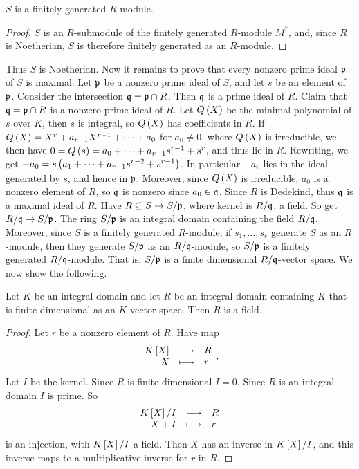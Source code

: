 \begin{corollary}
$ S $ is a finitely generated $ R $-module.
\end{corollary}

\begin{proof}
$ S $ is an $ R $-submodule of the finitely generated $ R $-module $ M^* $, and, since $ R $ is Noetherian, $ S $ is therefore finitely generated as an $ R $-module.
\end{proof}

Thus $ S $ is Noetherian. Now it remains to prove that every nonzero prime ideal $ \mathfrak{p} $ of $ S $ is maximal. Let $ \mathfrak{p} $ be a nonzero prime ideal of $ S $, and let $ s $ be an element of $ \mathfrak{p} $. Consider the intersection $ \mathfrak{q} = \mathfrak{p} \cap R $. Then $ \mathfrak{q} $ is a prime ideal of $ R $. Claim that $ \mathfrak{q} = \mathfrak{p} \cap R $ is a nonzero prime ideal of $ R $. Let $ Q\br{X} $ be the minimal polynomial of $ s $ over $ K $, then $ s $ is integral, so $ Q\br{X} $ has coefficients in $ R $. If $ Q\br{X} = X^r + a_{r - 1}X^{r - 1} + \dots + a_0 $ for $ a_0 \ne 0 $, where $ Q\br{X} $ is irreducible, we then have $ 0 = Q\br{s} = a_0 + \dots + a_{r - 1}s^{r - 1} + s^r $, and thus lie in $ R $. Rewriting, we get $ -a_0 = s\br{a_1 + \dots + a_{r - 1}s^{r - 2} + s^{r - 1}} $. In particular $ -a_0 $ lies in the ideal generated by $ s $, and hence in $ \mathfrak{p} $. Moreover, since $ Q\br{X} $ is irreducible, $ a_0 $ is a nonzero element of $ R $, so $ \mathfrak{q} $ is nonzero since $ a_0 \in \mathfrak{q} $. Since $ R $ is Dedekind, thus $ \mathfrak{q} $ is a maximal ideal of $ R $. Have $ R \subseteq S \to S / \mathfrak{p} $, where kernel is $ R / \mathfrak{q} $, a field. So get $ R / \mathfrak{q} \to S / \mathfrak{p} $. The ring $ S / \mathfrak{p} $ is an integral domain containing the field $ R / \mathfrak{q} $. Moreover, since $ S $ is a finitely generated $ R $-module, if $ s_1, \dots, s_r $ generate $ S $ as an $ R $-module, then they generate $ S / \mathfrak{p} $ as an $ R / \mathfrak{q} $-module, so $ S / \mathfrak{p} $ is a finitely generated $ R / \mathfrak{q} $-module. That is, $ S / \mathfrak{p} $ is a finite dimensional $ R / \mathfrak{q} $-vector space. We now show the following.

\begin{lemma}
\label{lem:12.3.7}
Let $ K $ be an integral domain and let $ R $ be an integral domain containing $ K $ that is finite dimensional as an $ K $-vector space. Then $ R $ is a field.
\end{lemma}

\begin{proof}
Let $ r $ be a nonzero element of $ R $. Have map
$$ \function{K\sbr{X}}{R}{X}{r}. $$
Let $ I $ be the kernel. Since $ R $ is finite dimensional $ I = 0 $. Since $ R $ is an integral domain $ I $ is prime. So
$$ \function{K\sbr{X} / I}{R}{X + I}{r} $$
is an injection, with $ K\sbr{X} / I $ a field. Then $ X $ has an inverse in $ K\sbr{X} / I $, and this inverse maps to a multiplicative inverse for $ r $ in $ R $.
\end{proof}

